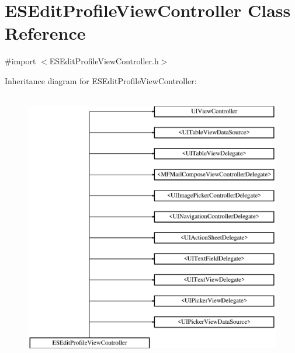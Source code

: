 \hypertarget{interface_e_s_edit_profile_view_controller}{}\section{E\+S\+Edit\+Profile\+View\+Controller Class Reference}
\label{interface_e_s_edit_profile_view_controller}


{\ttfamily \#import $<$E\+S\+Edit\+Profile\+View\+Controller.\+h$>$}

Inheritance diagram for E\+S\+Edit\+Profile\+View\+Controller\+:\begin{figure}[H]
\begin{center}
\leavevmode
\includegraphics[height=12.000000cm]{interface_e_s_edit_profile_view_controller}
\end{center}
\end{figure}
